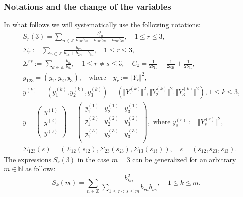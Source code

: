 \documentclass[preprint,12pt]{elsarticle}
\numberwithin{equation}{section}
\begin{document}
\subsubsection{Notations and the change of the variables}

In what follows we will systematically use the following notations:
\begin{eqnarray}
&& 
\label{S_r(3).1}
S_r(3)=\sum_{n\in \mathbb Z}\frac{b_{rn}^2}{b_{1n}b_{2n}+b_{1n}b_{3n}+b_{2n}b_{3n}},\quad 1\leq r\leq 3,\\
\label{Sigma_r}
&&\Sigma_r:=\sum_{n\in \mathbb Z}\frac{b_{rn}}{b_{1n}+b_{2n}+b_{3n}},\quad  1\leq r\leq 3,\\
\label{Sigma^(rs)}
&&\Sigma^{rs}:=\sum_{k\in{\mathbb Z}}\frac{b_{rk}}{b_{sk}},\quad 1\leq r\not=s\leq 3,
\quad
C_k=\frac{1}{2b_{1k}}+\frac{1}{2b_{2k}}+\frac{1}{2b_{3k}},
\\
\label{y(123)}
&&y_{123}=(y_1,y_2,y_3),\quad\text{where}\quad y_r:=\Vert Y_r\Vert^2,\\ 
 \label{y^(k).m=3}
&&y^{(k)}\!=\!(y_1^{(k)},y_2^{(k)},y_3^{(k)})\!=\!(\Vert Y_1^{(k)}\Vert^2,\Vert Y_2^{(k)}\Vert^2,\Vert Y_3^{(k)}\Vert^2),\,1\leq k\leq 3,\\
\label{y-mat.m=3}
&&y=\!
\left(\begin{array}{c}
y^{(1)}\\
y^{(2)}\\
y^{(3)}
\end{array}\right)=\left(\begin{array}{ccc}
y_1^{(1)}&y_2^{(1)}&y_3^{(1)}\\
y_1^{(2)}&y_2^{(2)}&y_3^{(2)}\\
y_1^{(3)}&y_2^{(3)}&y_3^{(3)}\\
\end{array}\right),\,\,\text{where}\,\, y_s^{(r)}:=\Vert Y_s^{(r)}\Vert^2,\,\,\,\\
\label{Sigma(s)} 
&&
\Sigma_{123}(s)
=(\Sigma_{12}(s_{12}),\Sigma_{23}(s_{23}),\Sigma_{13}(s_{13})),\quad s=(s_{12},s_{23},s_{13}).
\end{eqnarray}
The expressions $S_r(3)$ in the case $m=3$ can be generalized for an arbitrary  $m\in \mathbb N$ as follows:
%
\begin{equation}
\label{S_k(m)}
S_k(m)=\sum_{n\in \mathbb Z}\frac{b_{kn}^2}{\sum_{1\leq r<s\leq m}b_{rn}b_{sn}},\quad 1\leq k\leq m.
\end{equation}
\end{document}
